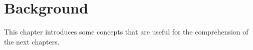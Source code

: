 \chapter{Background} 
This chapter introduces some concepts that are useful for the comprehension of the next chapters.

 










